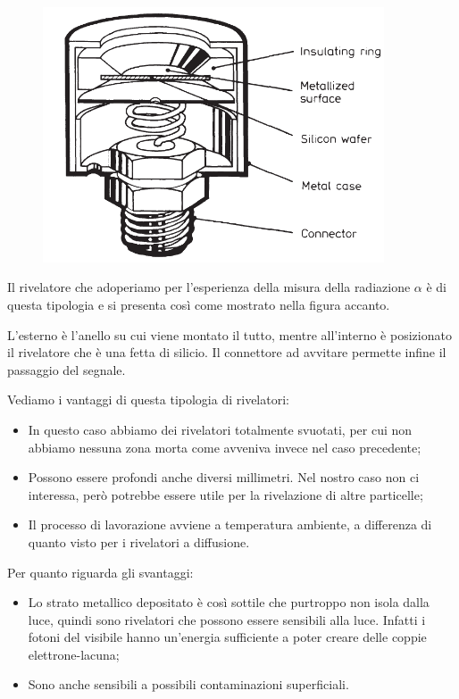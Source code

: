 \begin{minipage}{0.49\textwidth}
   \begin{figure}[H]
      \centering
      \includegraphics[width=0.9\textwidth]{immagini/schema_rivelatore_SSB.png}
   \end{figure}
\end{minipage}
\begin{minipage}{0.5\textwidth}
   \vspace{0.4cm}Il rivelatore che adoperiamo per l'esperienza della misura della radiazione $\alpha$ è di questa tipologia e si presenta così come mostrato nella figura accanto.
   
   L'esterno è l'anello su cui viene montato il tutto, mentre all'interno è posizionato il rivelatore che è una fetta di silicio. Il connettore ad avvitare permette infine il passaggio del segnale.
\end{minipage}

\vspace{0.4cm}Vediamo i vantaggi di questa tipologia di rivelatori:
\begin{itemize}[leftmargin=0.5cm]
   \item In questo caso abbiamo dei rivelatori totalmente svuotati, per cui non abbiamo nessuna zona morta come avveniva invece nel caso precedente;
   \item Possono essere profondi anche diversi millimetri. Nel nostro caso non ci interessa, però potrebbe essere utile per la rivelazione di altre particelle;
   \item Il processo di lavorazione avviene a temperatura ambiente, a differenza di quanto visto per i rivelatori a diffusione.
\end{itemize}
Per quanto riguarda gli svantaggi:
\begin{itemize}[leftmargin=0.5cm]
   \item Lo strato metallico depositato è così sottile che purtroppo non isola dalla luce, quindi sono rivelatori che possono essere sensibili alla luce. Infatti i fotoni del visibile hanno un'energia sufficiente a poter creare delle coppie elettrone-lacuna;
   \item Sono anche sensibili a possibili contaminazioni superficiali.
\end{itemize}

